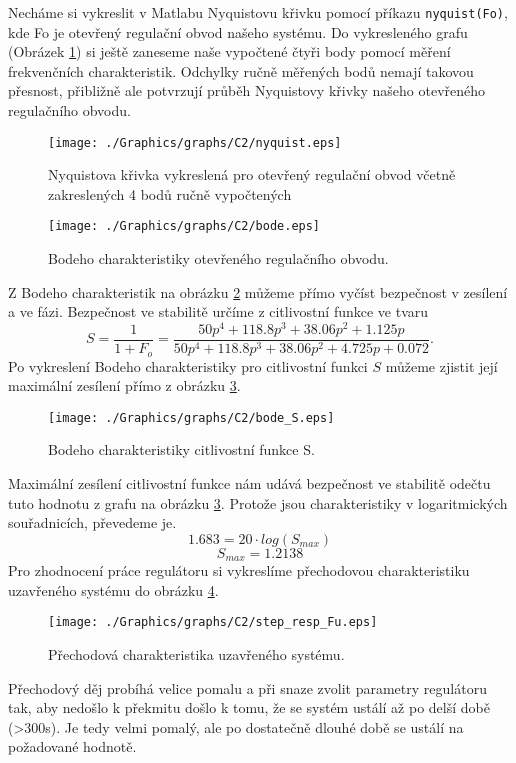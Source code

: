 \documentclass{article}
\begin{document}
			\noindent
			Necháme si vykreslit v Matlabu Nyquistovu křivku pomocí příkazu \verb*|nyquist(Fo)|, kde Fo je otevřený regulační obvod našeho systému. Do vykresleného grafu (Obrázek \ref{pic:nyquist}) si ještě zaneseme naše vypočtené čtyři body pomocí měření frekvenčních charakteristik. Odchylky ručně měřených bodů nemají takovou přesnost, přibližně ale potvrzují průběh Nyquistovy křivky našeho otevřeného regulačního obvodu.
			\begin{figure}[H]
				\centering
				\texttt{[image: ./Graphics/graphs/C2/nyquist.eps]}
				\caption{Nyquistova křivka vykreslená pro otevřený regulační obvod včetně zakreslených 4 bodů ručně vypočtených}
				\label{pic:nyquist}
			\end{figure}
			\begin{figure}[H]
				\centering
				\texttt{[image: ./Graphics/graphs/C2/bode.eps]}
				\caption{Bodeho charakteristiky otevřeného regulačního obvodu.}
				\label{pic:bode}
			\end{figure}
			\noindent
			Z Bodeho charakteristik na obrázku \ref{pic:bode} můžeme přímo vyčíst bezpečnost v zesílení a ve fázi. Bezpečnost ve stabilitě určíme z citlivostní funkce ve tvaru
			\[S=\frac{1}{1+F_{o}}=\frac{50p^{4} + 118.8p^{3} + 38.06p^{2} + 1.125p}{50p^{4} + 118.8p^{3} + 38.06p^{2} + 4.725p + 0.072}.\]
			Po vykreslení Bodeho charakteristiky pro citlivostní funkci \(S\) můžeme zjistit její maximální zesílení přímo z obrázku \ref{pic:bode_S}.
			\begin{figure}[H]
				\centering
				\texttt{[image: ./Graphics/graphs/C2/bode\_S.eps]}
				\caption{Bodeho charakteristiky citlivostní funkce S.}
				\label{pic:bode_S}
			\end{figure}
			Maximální zesílení citlivostní funkce nám udává bezpečnost ve stabilitě odečtu tuto hodnotu z grafu na obrázku \ref{pic:bode_S}. Protože jsou charakteristiky v logaritmických souřadnicích, převedeme je.
			\[1.683=20\cdot log(S_{max})\]
			\[S_{max}=1.2138\]
			Pro zhodnocení práce regulátoru si vykreslíme přechodovou charakteristiku uzavřeného systému do obrázku \ref{pic:step_resp_Fu}.
			\begin{figure}[H]
				\centering
				\texttt{[image: ./Graphics/graphs/C2/step\_resp\_Fu.eps]}
				\caption{Přechodová charakteristika uzavřeného systému.}
				\label{pic:step_resp_Fu}
			\end{figure}
			Přechodový děj probíhá velice pomalu a při snaze zvolit parametry regulátoru tak, aby nedošlo k překmitu došlo k tomu, že se systém ustálí až po delší době (\textgreater 300s). Je tedy velmi pomalý, ale po dostatečně dlouhé době se ustálí na požadované hodnotě.
\end{document}
